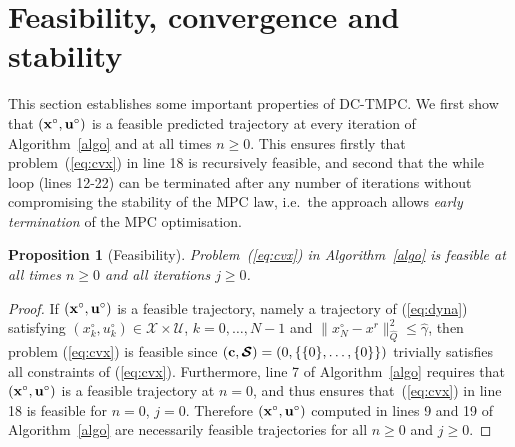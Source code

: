 \documentclass[a4paper, 10 pt, conference]{IEEEconf}
\newtheorem{proposition}[theorem]{Proposition}
\def\U{\mathcal{U}}
\def\X{\mathcal{X}}
\def\bc{{\bf c}}
\def\bS{\boldsymbol{\mathcal{S}}}
\begin{document}
\section{Feasibility, convergence and stability}
\label{sec:convergence}

This section establishes some important properties of DC-TMPC. 
We first show that $({\bf x}^\circ,{\bf u}^\circ)$ is a feasible predicted trajectory at every iteration of Algorithm~\ref{algo} and at all times $n\geq 0$. This ensures firstly that
problem~(\ref{eq:cvx}) in line 18 is recursively feasible,
%
and second that
the while loop (lines 12-22) can be terminated after any number of iterations without compromising the stability of the MPC law, i.e.~the approach allows \textit{early termination} of the MPC optimisation.

\begin{proposition}[Feasibility]\label{prop:feas}
Problem~(\ref{eq:cvx}) in Algorithm~\ref{algo} is feasible  at all times $n\geq 0$ and all iterations $j\geq 0$.
\end{proposition}

\begin{proof}
If $({\bf x}^\circ, {\bf u}^\circ)$ is a feasible trajectory, namely a trajectory of (\ref{eq:dyna}) satisfying $(x^\circ_k,u^\circ_k)\in\X\times\U$, $k=0,\ldots,{N-1}$ and $\|x_N^\circ-x^r\|_{\hat{Q}}^2\leq \hat{\gamma}$, then problem (\ref{eq:cvx}) is feasible since $(\bc,\bS) = (0,\{\{0\},\ldots,\{0\}\})$ trivially satisfies all constraints of (\ref{eq:cvx}).
%
Furthermore, line 7 of Algorithm~\ref{algo} requires that $({\bf x}^\circ, {\bf u}^\circ)$ is a feasible trajectory at $n=0$, and thus ensures that~(\ref{eq:cvx}) in line 18 is feasible for $n=0$, $j=0$.
%
Therefore $({\bf x}^\circ, {\bf u}^\circ)$ computed in lines 9 and 19 of Algorithm~\ref{algo} are necessarily feasible trajectories for all $n\geq 0$ and $j\geq 0$.
%

\end{proof}
\end{document}

